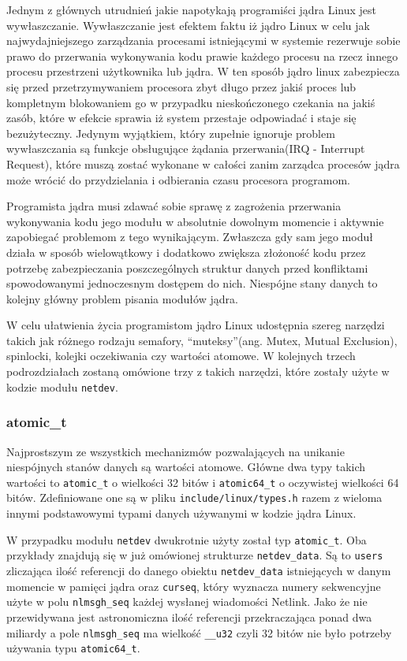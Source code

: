 \documentclass[10pt]{article}
\begin{document}
Jednym z głównych utrudnień jakie napotykają programiści jądra Linux
jest wywłaszczanie. Wywłaszczanie jest efektem faktu iż jądro Linux w
celu jak najwydajniejszego zarządzania procesami istniejącymi w systemie
rezerwuje sobie prawo do przerwania wykonywania kodu prawie każdego
procesu na rzecz innego procesu przestrzeni użytkownika lub jądra. W ten
sposób jądro linux zabezpiecza się przed przetrzymywaniem procesora zbyt
długo przez jakiś proces lub kompletnym blokowaniem go w przypadku
nieskończonego czekania na jakiś zasób, które w efekcie sprawia iż
system przestaje odpowiadać i staje się bezużyteczny. Jedynym wyjątkiem,
który zupełnie ignoruje problem wywłaszczania są funkcje obsługujące
żądania przerwania(IRQ - Interrupt Request), które muszą zostać wykonane
w całości zanim zarządca procesów jądra może wrócić do przydzielania i
odbierania czasu procesora programom.

Programista jądra musi zdawać sobie sprawę z zagrożenia przerwania
wykonywania kodu jego modułu w absolutnie dowolnym momencie i aktywnie
zapobiegać problemom z tego wynikającym. Zwłaszcza gdy sam jego moduł
działa w sposób wielowątkowy i dodatkowo zwiększa złożoność kodu przez
potrzebę zabezpieczania poszczególnych struktur danych przed konfliktami
spowodowanymi jednoczesnym dostępem do nich. Niespójne stany danych to
kolejny główny problem pisania modułów jądra.

W celu ułatwienia życia programistom jądro Linux udostępnia szereg
narzędzi takich jak różnego rodzaju semafory, ``muteksy''(ang. Mutex,
Mutual Exclusion), spinlocki, kolejki oczekiwania czy wartości atomowe.
W kolejnych trzech podrozdziałach zostaną omówione trzy z takich
narzędzi, które zostały użyte w kodzie modułu \texttt{netdev}.

\subsubsection{atomic\_t}

Najprostszym ze wszystkich mechanizmów pozwalających na unikanie
niespójnych stanów danych są wartości atomowe. Główne dwa typy takich
wartości to \texttt{atomic\_t} o wielkości 32 bitów i
\texttt{atomic64\_t} o oczywistej wielkości 64 bitów. Zdefiniowane one
są w pliku \texttt{include/linux/types.h} razem z wieloma innymi
podstawowymi typami danych używanymi w kodzie jądra Linux.

W przypadku modułu \texttt{netdev} dwukrotnie użyty został typ
\texttt{atomic\_t}. Oba przykłady znajdują się w już omówionej
strukturze \texttt{netdev\_data}. Są to \texttt{users} zliczająca ilość
referencji do danego obiektu \texttt{netdev\_data} istniejących w danym
momencie w pamięci jądra oraz \texttt{curseq}, który wyznacza numery
sekwencyjne użyte w polu \texttt{nlmsgh\_seq} każdej wysłanej wiadomości
Netlink. Jako że nie przewidywana jest astronomiczna ilość referencji
przekraczająca ponad dwa miliardy a pole \texttt{nlmsgh\_seq} ma
wielkość \texttt{\_\_u32} czyli 32 bitów nie było potrzeby używania typu
\texttt{atomic64\_t}.
\end{document}
